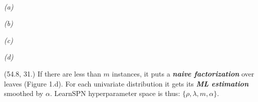 \documentclass[final]{beamer}
\begin{document}
\begin{frame}{}
\begin{textblock}{60}
{\begin{minipage}[t]{8.1cm}
    \end{minipage}}\hspace{30pt}\\
  \vspace{-20pt}\hspace{80pt}\begin{minipage}[t]{7cm}
    \scriptsize\emph{(a)}
  \end{minipage}\hspace{80pt}\begin{minipage}[t]{7cm}
    \scriptsize\emph{(b)}
  \end{minipage}\hspace{175pt}\begin{minipage}[t]{7cm}
    \scriptsize\emph{(c)}
  \end{minipage}\hspace{175pt}\begin{minipage}[t]{7cm}
    \scriptsize\emph{(d)}
  \end{minipage}
    
    
  \end{textblock}
  
  
  \begin{textblock}{25.2}(54.8, 31.)
    \footnotesize
    If there are less than $m$ instances, it puts a \textbf{\emph{naive
        factorization}} over leaves (Figure 1.d). For each univariate distribution
    it gets its \emph{\textbf{ML estimation}} smoothed by $\alpha$. LearnSPN
    hyperparameter space is thus: $\{\rho, \lambda, m, \alpha\}$.\par\bigskip


\end{textblock}
\end{frame}
\end{document}
